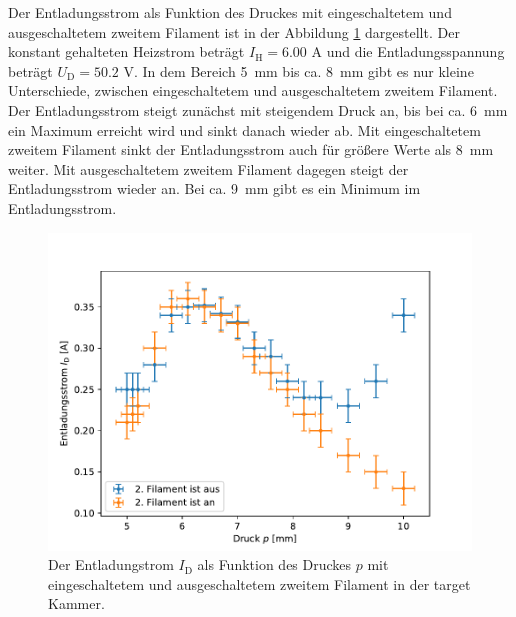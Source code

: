 Der Entladungsstrom als Funktion des Druckes mit eingeschaltetem und ausgeschaltetem zweitem Filament ist in der Abbildung \ref{fig:3_1_Druck} dargestellt. Der konstant gehalteten Heizstrom beträgt $ I_{\mathrm{H}} =6.00$ A und die Entladungsspannung beträgt $U_{\mathrm{D}}=50.2$ V. In dem Bereich \SI{5}{mm} bis ca. \SI{8}{mm} gibt es nur kleine Unterschiede, zwischen eingeschaltetem und ausgeschaltetem zweitem Filament. Der Entladungsstrom steigt zunächst mit steigendem Druck an, bis bei ca. \SI{6}{mm} ein Maximum erreicht wird und sinkt danach wieder ab. Mit eingeschaltetem zweitem Filament sinkt der Entladungsstrom auch für größere Werte als \SI{8}{mm} weiter. Mit ausgeschaltetem zweitem Filament dagegen steigt der Entladungsstrom wieder an. Bei ca. \SI{9}{mm} gibt es ein Minimum im Entladungsstrom. 
\begin{figure}[H]
\centering
\includegraphics[scale=0.6]{3_1_Druck.pdf}
\caption{Der Entladungstrom $I_{\mathrm{D}}$ als Funktion des Druckes $p$ mit eingeschaltetem und ausgeschaltetem zweitem Filament in der target Kammer.}
\label{fig:3_1_Druck}
\end{figure}
